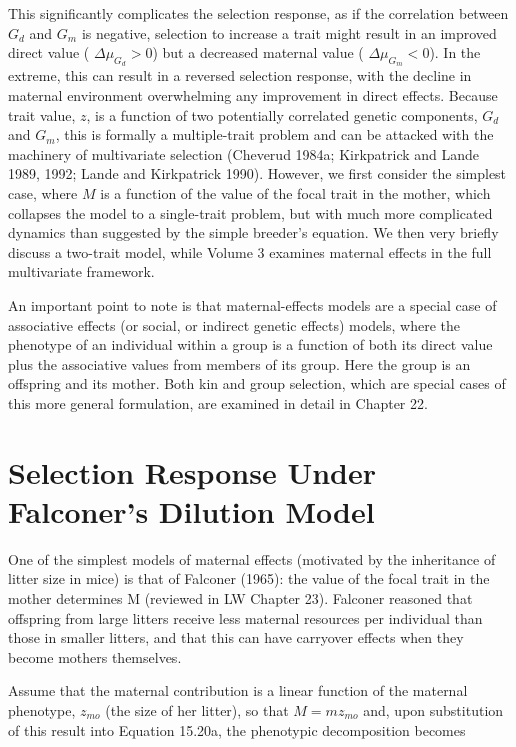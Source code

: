 \documentclass{article}
\begin{document}
This significantly complicates the selection response, as if the correlation between  $ G_d $ and  $ G_m $ is negative, selection to increase a trait might result in an improved direct value ( $ \Delta \mu_{G_d} > 0 $) but a decreased maternal value ( $ \Delta \mu_{G_m} < 0 $). In the extreme, this can result in a reversed selection response, with the decline in maternal environment overwhelming any improvement in direct effects. Because trait value,  $ z $, is a function of two potentially correlated genetic components,  $ G_d $ and  $ G_m $, this is formally a multiple-trait problem and can be attacked with the machinery of multivariate selection (Cheverud 1984a; Kirkpatrick and Lande 1989, 1992; Lande and Kirkpatrick 1990). However, we first consider the simplest case, where  $ M $ is a function of the value of the focal trait in the mother, which collapses the model to a single-trait problem, but with much more complicated dynamics than suggested by the simple breeder's equation. We then very briefly discuss a two-trait model, while Volume 3 examines maternal effects in the full multivariate framework.

An important point to note is that maternal-effects models are a special case of associative effects (or social, or indirect genetic effects) models, where the phenotype of an individual within a group is a function of both its direct value plus the associative values from members of its group. Here the group is an offspring and its mother. Both kin and group selection, which are special cases of this more general formulation, are examined in detail in Chapter 22.

\section{Selection Response Under Falconer's Dilution Model}
One of the simplest models of maternal effects (motivated by the inheritance of litter size in mice) is that of Falconer (1965): the value of the focal trait in the mother determines M (reviewed in LW Chapter 23). Falconer reasoned that offspring from large litters receive less maternal resources per individual than those in smaller litters, and that this can have carryover effects when they become mothers themselves.

Assume that the maternal contribution is a linear function of the maternal phenotype,  $ z_{mo} $ (the size of her litter), so that  $ M = mz_{mo} $ and, upon substitution of this result into Equation 15.20a, the phenotypic decomposition becomes
\end{document}
